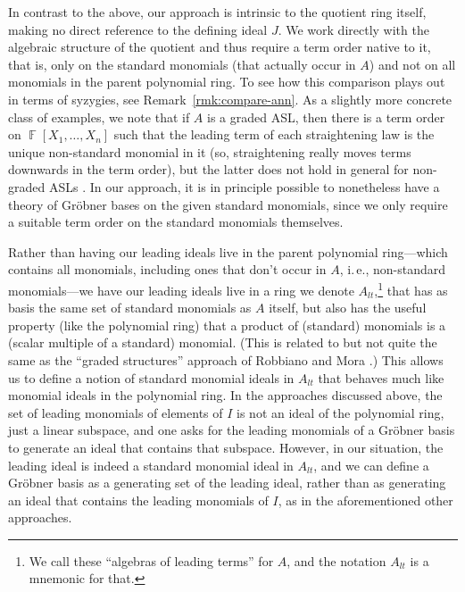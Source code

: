 \documentclass[11pt,reqno]{amsart}
\DeclareMathOperator{\F}{\mathbb{F}}
\theoremstyle{definition}
\numberwithin{equation}{section}
\begin{document}
In contrast to the above, our approach is intrinsic to the quotient ring itself, making no direct reference to the defining ideal $J$. We work directly with the algebraic structure of the quotient and thus require a term order native to it, that is, only on the standard monomials (that actually occur in $A$) and not on all monomials in the parent polynomial ring. To see how this comparison plays out in terms of syzygies, see Remark~\ref{rmk:compare-ann}. As a slightly more concrete class of examples, we note that if $A$ is a graded ASL, then there is a term order on $\F[X_1,\dotsc,X_n]$ such that the leading term of each straightening law is the unique non-standard monomial in it (so, straightening really moves terms downwards in the term order), but the latter does not hold in general for non-graded ASLs \cite{trung,GrabePauer}. In our approach, it is in principle possible to nonetheless have a theory of Gröbner bases on the given standard monomials, since we only require a suitable term order on the standard monomials themselves. 

Rather than having our leading ideals live in the parent polynomial ring---which contains all monomials, including ones that don't occur in $A$, i.\,e., non-standard monomials---we have our leading ideals live in a ring we denote $A_{lt}$,\footnote{We call these ``algebras of leading terms'' for $A$, and the notation $A_{lt}$ is a mnemonic for that.} that has as basis the same set of standard monomials as $A$ itself, but also has the useful property (like the polynomial ring) that a product of (standard) monomials is a (scalar multiple of a standard) monomial. (This is related to but not quite the same as the ``graded structures'' approach of Robbiano \cite{robbiano} and Mora \cite{mora, moraIntro}.) This allows us to define a notion of standard monomial ideals in $A_{lt}$ that behaves much like monomial ideals in the polynomial ring. In the approaches discussed above, the set of leading monomials of elements of $I$ is not an ideal of the polynomial ring, just a linear subspace, and one asks for the leading monomials of a Gröbner basis to generate an ideal that contains that subspace. However, in our situation, the leading ideal is indeed a standard monomial ideal in $A_{lt}$, and we can define a Gröbner basis as a generating set of the leading ideal, rather than as generating an ideal that contains the leading monomials of $I$, as in the aforementioned other approaches.  
\end{document}
